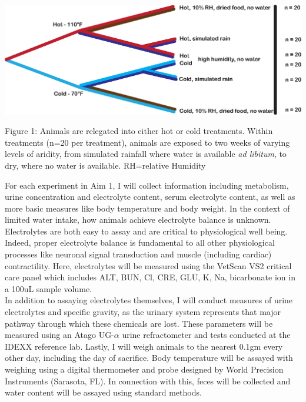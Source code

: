 \documentclass[11pt]{article}
\begin{document}
\vspace{2mm}

\begin{mdframed}
  \begin{center}
    \includegraphics[width=1\textwidth]{exp_design_fig.eps}
  \end{center}  

\noindent \small{Figure 1: Animals are relegated into either hot or cold treatments. Within treatments (n=20 per treatment), animals are exposed to two weeks of varying levels of aridity, from simulated rainfall where water is available \textit{ad libitum}, to dry, where no water is available. RH=relative Humidity}

\end{mdframed}

\vspace{5mm}


For each experiment in Aim 1, I will collect information including metabolism, urine concentration and electrolyte content, serum electrolyte content, as well as more basic measures like body temperature and body weight. In the context of limited water intake, how animals achieve electrolyte balance is unknown. Electrolytes are both easy to assay and are critical to physiological well being. Indeed, proper electrolyte balance is fundamental to all other physiological processes like neuronal signal transduction and muscle (including cardiac) contractility. Here, electrolytes will be measured using the VetScan VS2 critical care panel which includes ALT, BUN, Cl, CRE, GLU, K, Na, bicarbonate ion in a 100uL sample volume. \\

In addition to assaying electrolytes themselves, I will conduct measures of urine electrolytes and specific gravity, as the urinary system represents that major pathway through which these chemicals are lost. These parameters will be measured using an Atago UG-$\alpha$ urine refractometer and tests conducted at the IDEXX reference lab. Lastly, I will weigh animals to the nearest 0.1gm every other day, including the day of sacrifice. Body temperature will be assayed with weighing using a digital thermometer and probe designed by World Precision Instruments (Sarasota, FL). In connection with this, feces will be collected and water content will be assayed using  standard methods. \\
\end{document}
